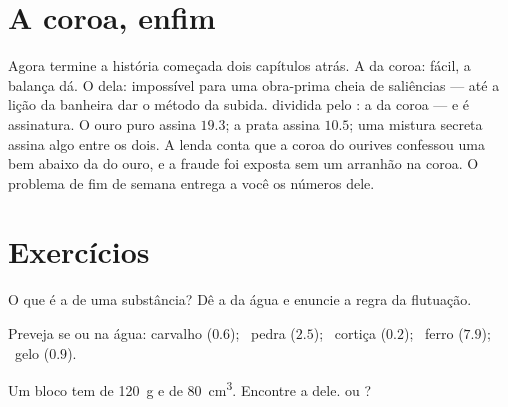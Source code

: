 \section{A coroa, enfim}

\begin{example}\label{ex:g6:density-floating:crown}
Agora termine a história começada dois capítulos atrás. A  da
coroa: fácil, a balança dá. O  dela: impossível para uma
obra-prima cheia de saliências --- até a lição da banheira dar o
método da subida.  dividida pelo : a \emph{} da
coroa --- e  é assinatura. O ouro puro assina $19.3$; a
prata assina $10.5$; uma mistura secreta assina algo entre os dois. A
lenda conta que a coroa do ourives confessou uma  bem abaixo
da do ouro, e a fraude foi exposta sem um arranhão na coroa. O
problema de fim de semana entrega a você os números dele.
\end{example}

\section{Exercícios}

\begin{exercise}[$\star$]\label{exo:g6:density-floating:1}
O que é a  de uma substância? Dê a da água e enuncie a regra
da flutuação.
\end{exercise}

\begin{exercise}[$\star$]\label{exo:g6:density-floating:2}
Preveja se  ou  na água: carvalho ($0.6$); \ pedra
($2.5$); \ cortiça ($0.2$); \ ferro ($7.9$); \ gelo ($0.9$).
\end{exercise}

\begin{exercise}[$\star$]\label{exo:g6:density-floating:3}
Um bloco tem  de \qty{120}{g} e  de \qty{80}{cm^3}.
Encontre a  dele.  ou ?
\end{exercise}

